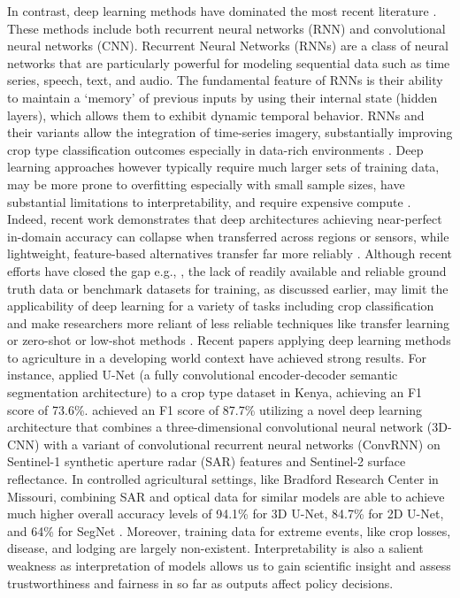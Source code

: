 \documentclass[
  journal,
  twocolumn]{IEEEtran}
\begin{document}
In contrast, deep learning methods have dominated the most recent
literature \citep{agriculture13050965, hohl2024recent}. These methods
include both recurrent neural networks (RNN) and convolutional neural
networks (CNN). Recurrent Neural Networks (RNNs) are a class of neural
networks that are particularly powerful for modeling sequential data
such as time series, speech, text, and audio. The fundamental feature of
RNNs is their ability to maintain a `memory' of previous inputs by using
their internal state (hidden layers), which allows them to exhibit
dynamic temporal behavior. RNNs and their variants allow the integration
of time-series imagery, substantially improving crop type classification
outcomes especially in data-rich environments
\citep{agriculture13050965, camps2021deep}. Deep learning approaches
however typically require much larger sets of training data, may be more
prone to overfitting especially with small sample sizes, have
substantial limitations to interpretability, and require expensive
compute
\citep{hohl2024recent, rs13132591, agriculture13050965, LI2023103345, MA2019166}.
Indeed, recent work demonstrates that deep architectures achieving
near-perfect in-domain accuracy can collapse when transferred across
regions or sensors, while lightweight, feature-based alternatives
transfer far more reliably
\citep{pankajakshan2025, rustowicz2019, mai2025}. Although recent
efforts have closed the gap e.g., \citep{tseng2021cropharvest}, the lack
of readily available and reliable ground truth data or benchmark
datasets for training, as discussed earlier, may limit the applicability
of deep learning for a variety of tasks including crop classification
and make researchers more reliant of less reliable techniques like
transfer learning or zero-shot or low-shot methods
\citep{owusu2024towards, LI2023103345, MA2019166}. Recent papers
applying deep learning methods to agriculture in a developing world
context have achieved strong results. For instance,
\citet{buttar2024satellite} applied U-Net (a fully convolutional
encoder-decoder semantic segmentation architecture) to a crop type
dataset in Kenya, achieving an F1 score of 73.6\%.
\citet{liu2024enhanced} achieved an F1 score of 87.7\% utilizing a novel
deep learning architecture that combines a three-dimensional
convolutional neural network (3D-CNN) with a variant of convolutional
recurrent neural networks (ConvRNN) on Sentinel-1 synthetic aperture
radar (SAR) features and Sentinel-2 surface reflectance. In controlled
agricultural settings, like Bradford Research Center in Missouri,
combining SAR and optical data for similar models are able to achieve
much higher overall accuracy levels of 94.1\% for 3D U-Net, 84.7\% for
2D U-Net, and 64\% for SegNet \citep{ADRIAN2021215}. Moreover, training
data for extreme events, like crop losses, disease, and lodging are
largely non-existent. Interpretability is also a salient weakness as
interpretation of models allows us to gain scientific insight and assess
trustworthiness and fairness in so far as outputs affect policy
decisions.
\end{document}
